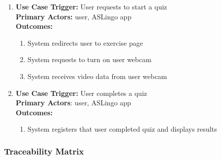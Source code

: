 \documentclass[12pt, titlepage]{article}
\begin{document}
\begin{enumerate}
      
      \item
      \textbf{Use Case Trigger:} User requests to start a quiz\\
      \textbf{Primary Actors:} user, ASLingo app\\
      \textbf{Outcomes:}
      \begin{enumerate}
          \item System redirects user to exercise page
          \item System requests to turn on user webcam
          \item System receives video data from user webcam
      \end{enumerate}

      \item
      \textbf{Use Case Trigger:} User completes a quiz\\
      \textbf{Primary Actors}: user, ASLingo app\\
      \textbf{Outcomes:}
      \begin{enumerate}
          \item System registers that user completed quiz and displays results
      \end{enumerate}

\end{enumerate}

\subsubsection{Traceability Matrix}
\end{document}
